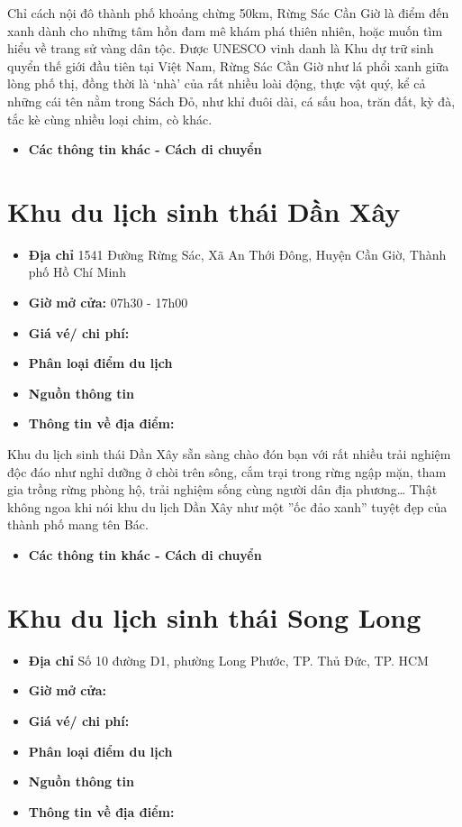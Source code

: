 \documentclass{article}
\begin{document}
Chỉ cách nội đô thành phố khoảng chừng 50km, Rừng Sác Cần Giờ là điểm đến xanh dành cho những tâm hồn đam mê khám phá thiên nhiên, hoặc muốn tìm hiểu về trang sử vàng dân tộc. Được UNESCO vinh danh là Khu dự trữ sinh quyển thế giới đầu tiên tại Việt Nam, Rừng Sác Cần Giờ như lá phổi xanh giữa lòng phố thị, đồng thời là ‘nhà’ của rất nhiều loài động, thực vật quý, kể cả những cái tên nằm trong Sách Đỏ, như khỉ đuôi dài, cá sấu hoa, trăn đất, kỳ đà, tắc kè cùng nhiều loại chim, cò khác.

\begin{itemize}
    \item{\textbf{Các thông tin khác - Cách di chuyển}}
\end{itemize}

\section{Khu du lịch sinh thái Dần Xây}
\begin{itemize}
    \item{\textbf{Địa chỉ}} 1541 Đường Rừng Sác, Xã An Thới Đông, Huyện Cần Giờ, Thành phố Hồ Chí Minh
    \item{\textbf{Giờ mở cửa:}} 07h30 - 17h00
    \item{\textbf{Giá vé/ chi phí:}}
    \item{\textbf{Phân loại điểm du lịch} }
    \item{\textbf{Nguồn thông tin}}
    \item{\textbf{Thông tin về địa điểm:}}
\end{itemize}

Khu du lịch sinh thái Dần Xây sẵn sàng chào đón bạn với rất nhiều trải nghiệm độc đáo như nghỉ dưỡng ở chòi trên sông, cắm trại trong rừng ngập mặn, tham gia trồng rừng phòng hộ, trải nghiệm sống cùng người dân địa phương… Thật không ngoa khi nói khu du lịch Dần Xây như một ”ốc đảo xanh” tuyệt đẹp của thành phố mang tên Bác.

\begin{itemize}
    \item{\textbf{Các thông tin khác - Cách di chuyển}}
\end{itemize}

\section{Khu du lịch sinh thái Song Long}
\begin{itemize}
    \item{\textbf{Địa chỉ}} Số 10 đường D1, phường Long Phước, TP. Thủ Đức, TP. HCM
    \item{\textbf{Giờ mở cửa:}}
    \item{\textbf{Giá vé/ chi phí:}}
    \item{\textbf{Phân loại điểm du lịch} }
    \item{\textbf{Nguồn thông tin}}
    \item{\textbf{Thông tin về địa điểm:}}
\end{itemize}
\end{document}
